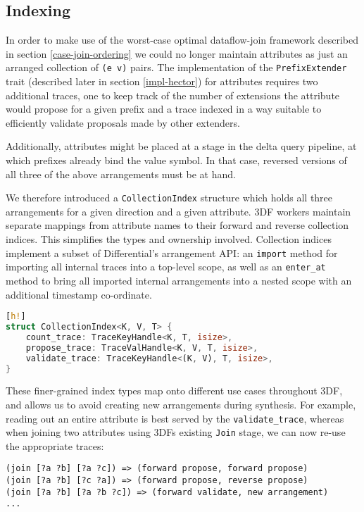 \documentclass[../index.tex]{subfiles}
\begin{document}
\subsection{Indexing}

In order to make use of the worst-case optimal dataflow-join framework
described in section \ref{case-join-ordering} we could no longer
maintain attributes as just an arranged collection of \texttt{(e v)}
pairs. The implementation of the \texttt{PrefixExtender} trait
(described later in section \ref{impl-hector}) for attributes requires
two additional traces, one to keep track of the number of extensions
the attribute would propose for a given prefix and a trace indexed in
a way suitable to efficiently validate proposals made by other
extenders.

Additionally, attributes might be placed at a stage in the delta query
pipeline, at which prefixes already bind the value symbol. In that
case, reversed versions of all three of the above arrangements must be
at hand.

We therefore introduced a \texttt{CollectionIndex} structure which
holds all three arrangements for a given direction and a given
attribute. 3DF workers maintain separate mappings from attribute names
to their forward and reverse collection indices. This simplifies the
types and ownership involved. Collection indices implement a subset of
Differential's arrangement API: an \texttt{import} method for
importing all internal traces into a top-level scope, as well as an
\texttt{enter\_at} method to bring all imported internal arrangements
into a nested scope with an additional timestamp co-ordinate.

\begin{lstlisting}[language=Rust, style=colouredRust][h!]
struct CollectionIndex<K, V, T> {
    count_trace: TraceKeyHandle<K, T, isize>,
    propose_trace: TraceValHandle<K, V, T, isize>,
    validate_trace: TraceKeyHandle<(K, V), T, isize>,
}
\end{lstlisting}

These finer-grained index types map onto different use cases
throughout 3DF, and allows us to avoid creating new arrangements
during synthesis. For example, reading out an entire attribute is best
served by the \texttt{validate\_trace}, whereas when joining two
attributes using 3DFs existing \texttt{Join} stage, we can now re-use
the appropriate traces:

\begin{verbatim}
(join [?a ?b] [?a ?c]) => (forward propose, forward propose)
(join [?a ?b] [?c ?a]) => (forward propose, reverse propose)
(join [?a ?b] [?a ?b ?c]) => (forward validate, new arrangement)
...
\end{verbatim}
\end{document}
